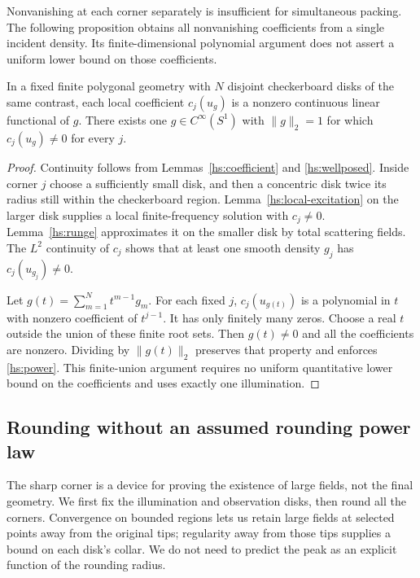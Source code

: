 Nonvanishing at each corner separately is insufficient for simultaneous
packing. The following proposition obtains all nonvanishing coefficients
from a single incident density. Its finite-dimensional polynomial argument
does not assert a uniform lower bound on those coefficients.

\begin{proposition}
\label{hs:simultaneous}
In a fixed finite polygonal geometry with $N$ disjoint checkerboard
disks of the same contrast, each local coefficient $c_j(u_g)$ is a
nonzero continuous linear functional of $g$.  There exists one
$g\in C^\infty(S^1)$ with $\|g\|_2=1$ for which
$c_j(u_g)\ne0$ for every $j$.
\end{proposition}

\begin{proof}
Continuity follows from Lemmas~\ref{hs:coefficient} and
\ref{hs:wellposed}.  Inside corner $j$ choose a sufficiently small
disk, and then a concentric disk twice its radius still within the
checkerboard region.  Lemma~\ref{hs:local-excitation} on the larger
disk supplies a local finite-frequency solution with $c_j\ne0$.
Lemma~\ref{hs:runge} approximates it on the smaller disk by total
scattering fields.  The $L^2$ continuity of $c_j$ shows that at least
one smooth density $g_j$ has $c_j(u_{g_j})\ne0$.

Let $g(t)=\sum_{m=1}^N t^{m-1}g_m$.  For each fixed $j$,
$c_j(u_{g(t)})$ is a polynomial in $t$ with nonzero coefficient of
$t^{j-1}$.  It has only finitely many zeros.  Choose a real $t$
outside the union of these finite root sets.  Then $g(t)\ne0$ and
all the coefficients are nonzero.  Dividing by $\|g(t)\|_2$ preserves
that property and enforces \eqref{hs:power}.  This finite-union
argument requires no uniform quantitative lower bound on the
coefficients and uses exactly one illumination.
\end{proof}

\subsection{Rounding without an assumed rounding power law}
\label{hs:rounding}

The sharp corner is a device for proving the existence of large fields,
not the final geometry.  We first fix the illumination and observation
disks, then round all the corners.  Convergence on bounded regions lets
us retain large fields at selected points away from the original tips;
regularity away from those tips supplies a bound on each disk's collar.
We do not need to predict the peak as an explicit function of the
rounding radius.

